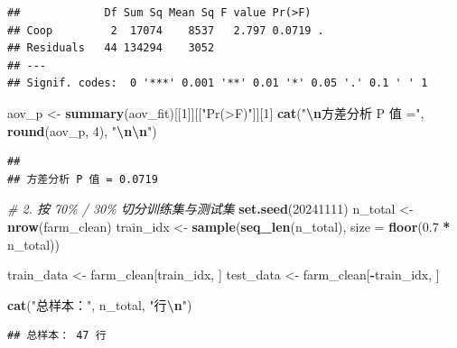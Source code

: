 \documentclass[
]{ctexart}
\newenvironment{Shaded}{\begin{snugshade}}{\end{snugshade}}
\newcommand{\AttributeTok}[1]{\textcolor[rgb]{0.13,0.29,0.53}{#1}}
\newcommand{\CommentTok}[1]{\textcolor[rgb]{0.56,0.35,0.01}{\textit{#1}}}
\newcommand{\DecValTok}[1]{\textcolor[rgb]{0.00,0.00,0.81}{#1}}
\newcommand{\FloatTok}[1]{\textcolor[rgb]{0.00,0.00,0.81}{#1}}
\newcommand{\FunctionTok}[1]{\textcolor[rgb]{0.13,0.29,0.53}{\textbf{#1}}}
\newcommand{\NormalTok}[1]{#1}
\newcommand{\OtherTok}[1]{\textcolor[rgb]{0.56,0.35,0.01}{#1}}
\newcommand{\SpecialCharTok}[1]{\textcolor[rgb]{0.81,0.36,0.00}{\textbf{#1}}}
\newcommand{\StringTok}[1]{\textcolor[rgb]{0.31,0.60,0.02}{#1}}
\begin{document}
\begin{verbatim}
##             Df Sum Sq Mean Sq F value Pr(>F)  
## Coop         2  17074    8537   2.797 0.0719 .
## Residuals   44 134294    3052                 
## ---
## Signif. codes:  0 '***' 0.001 '**' 0.01 '*' 0.05 '.' 0.1 ' ' 1
\end{verbatim}

\begin{Shaded}
\begin{Highlighting}[]
\NormalTok{aov\_p }\OtherTok{\textless{}{-}} \FunctionTok{summary}\NormalTok{(aov\_fit)[[}\DecValTok{1}\NormalTok{]][[}\StringTok{"Pr(\textgreater{}F)"}\NormalTok{]][}\DecValTok{1}\NormalTok{]}
\FunctionTok{cat}\NormalTok{(}\StringTok{"}\SpecialCharTok{\textbackslash{}n}\StringTok{方差分析 P 值 ="}\NormalTok{, }\FunctionTok{round}\NormalTok{(aov\_p, }\DecValTok{4}\NormalTok{), }\StringTok{"}\SpecialCharTok{\textbackslash{}n\textbackslash{}n}\StringTok{"}\NormalTok{)}
\end{Highlighting}
\end{Shaded}

\begin{verbatim}
## 
## 方差分析 P 值 = 0.0719
\end{verbatim}

\begin{Shaded}
\begin{Highlighting}[]
\CommentTok{\# 2. 按 70\% / 30\% 切分训练集与测试集}
\FunctionTok{set.seed}\NormalTok{(}\DecValTok{20241111}\NormalTok{)}
\NormalTok{n\_total   }\OtherTok{\textless{}{-}} \FunctionTok{nrow}\NormalTok{(farm\_clean)}
\NormalTok{train\_idx }\OtherTok{\textless{}{-}} \FunctionTok{sample}\NormalTok{(}\FunctionTok{seq\_len}\NormalTok{(n\_total), }\AttributeTok{size =} \FunctionTok{floor}\NormalTok{(}\FloatTok{0.7} \SpecialCharTok{*}\NormalTok{ n\_total))}

\NormalTok{train\_data }\OtherTok{\textless{}{-}}\NormalTok{ farm\_clean[train\_idx, ]}
\NormalTok{test\_data  }\OtherTok{\textless{}{-}}\NormalTok{ farm\_clean[}\SpecialCharTok{{-}}\NormalTok{train\_idx, ]}

\FunctionTok{cat}\NormalTok{(}\StringTok{"总样本："}\NormalTok{, n\_total,          }\StringTok{"行}\SpecialCharTok{\textbackslash{}n}\StringTok{"}\NormalTok{)}
\end{Highlighting}
\end{Shaded}

\begin{verbatim}
## 总样本： 47 行
\end{verbatim}
\end{document}
